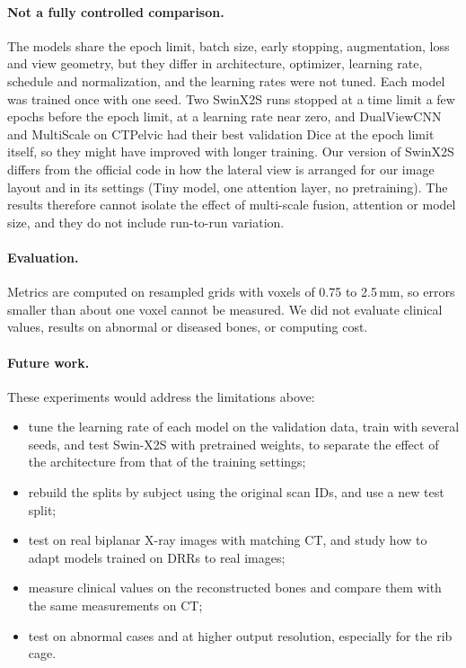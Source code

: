 \documentclass[11pt]{article}
\begin{document}
\paragraph{Not a fully controlled comparison.}
The models share the epoch limit, batch size, early stopping, augmentation, loss and view geometry, but they differ in architecture, optimizer, learning rate, schedule and normalization, and the learning rates were not tuned. Each model was trained once with one seed. Two SwinX2S runs stopped at a time limit a few epochs before the epoch limit, at a learning rate near zero, and DualViewCNN and MultiScale on CTPelvic had their best validation Dice at the epoch limit itself, so they might have improved with longer training. Our version of SwinX2S differs from the official code in how the lateral view is arranged for our image layout and in its settings (Tiny model, one attention layer, no pretraining). The results therefore cannot isolate the effect of multi-scale fusion, attention or model size, and they do not include run-to-run variation.

\paragraph{Evaluation.}
Metrics are computed on resampled grids with voxels of 0.75 to 2.5\,mm, so errors smaller than about one voxel cannot be measured. We did not evaluate clinical values, results on abnormal or diseased bones, or computing cost.

\paragraph{Future work.}
These experiments would address the limitations above:
\begin{itemize}
\item tune the learning rate of each model on the validation data, train with several seeds, and test Swin-X2S with pretrained weights, to separate the effect of the architecture from that of the training settings;
\item rebuild the splits by subject using the original scan IDs, and use a new test split;
\item test on real biplanar X-ray images with matching CT, and study how to adapt models trained on DRRs to real images;
\item measure clinical values on the reconstructed bones and compare them with the same measurements on CT;
\item test on abnormal cases and at higher output resolution, especially for the rib cage.
\end{itemize}
\end{document}
